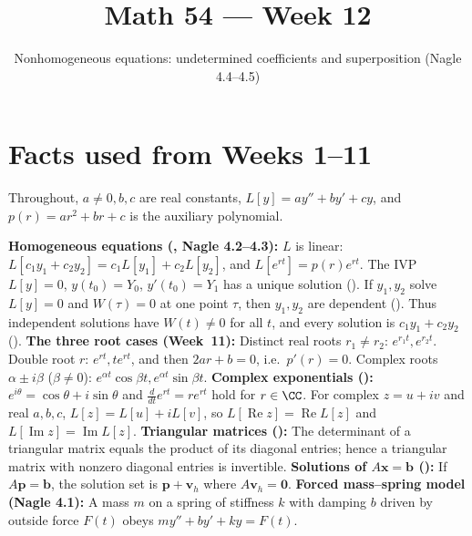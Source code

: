 \documentclass[10pt]{scrartcl}
\title{Math 54 --- Week 12}
\subtitle{Nonhomogeneous equations: undetermined coefficients and superposition (Nagle 4.4--4.5)}
\author{}\date{}\ihead{}
\newcommand{\vv}[1]{\mathbf{#1}}
\begin{document}
\maketitle

\section{Facts used from Weeks 1--11}
Throughout, $a\neq 0, b, c$ are real constants, $L[y]=ay''+by'+cy$, and $p(r)=ar^2+br+c$ is the auxiliary polynomial.
\begin{enumerate}[label=(W\arabic*),leftmargin=2.8em,itemsep=4pt]
  \ii {}\textbf{Homogeneous equations (, Nagle 4.2--4.3):} $L$ is linear: $L[c_1y_1+c_2y_2]=c_1L[y_1]+c_2L[y_2]$, and $L[e^{rt}]=p(r)e^{rt}$. The IVP $L[y]=0$, $y(t_0)=Y_0$, $y'(t_0)=Y_1$ has a unique solution (). If $y_1,y_2$ solve $L[y]=0$ and $W(\tau)=0$ at one point $\tau$, then $y_1,y_2$ are dependent (). Thus independent solutions have $W(t)\neq 0$ for all $t$, and every solution is $c_1y_1+c_2y_2$ ().
  \ii {}\textbf{The three root cases (Week~11):} Distinct real roots $r_1\neq r_2$: $e^{r_1t}, e^{r_2t}$. Double root $r$: $e^{rt}, te^{rt}$, and then $2ar+b=0$, i.e.\ $p'(r)=0$. Complex roots $\alpha\pm i\beta$ ($\beta\neq 0$): $e^{\alpha t}\cos\beta t, e^{\alpha t}\sin\beta t$.
  \ii {}\textbf{Complex exponentials ():} $e^{i\theta}=\cos\theta+i\sin\theta$ and $\frac{d}{dt}e^{rt}=re^{rt}$ hold for $r\in\CC$. For complex $z=u+iv$ and real $a,b,c$, $L[z]=L[u]+iL[v]$, so $L[\operatorname{Re}z]=\operatorname{Re}L[z]$ and $L[\operatorname{Im}z]=\operatorname{Im}L[z]$.
  \ii {}\textbf{Triangular matrices ():} The determinant of a triangular matrix equals the product of its diagonal entries; hence a triangular matrix with nonzero diagonal entries is invertible.
  \ii {}\textbf{Solutions of $A\vv x=\vv b$ ():} If $A\vv p=\vv b$, the solution set is $\vv p+\vv v_h$ where $A\vv v_h=\vv 0$.
  \ii {}\textbf{Forced mass--spring model (Nagle 4.1):} A mass $m$ on a spring of stiffness $k$ with damping $b$ driven by outside force $F(t)$ obeys $my''+by'+ky=F(t)$.
\end{enumerate}
\end{document}
